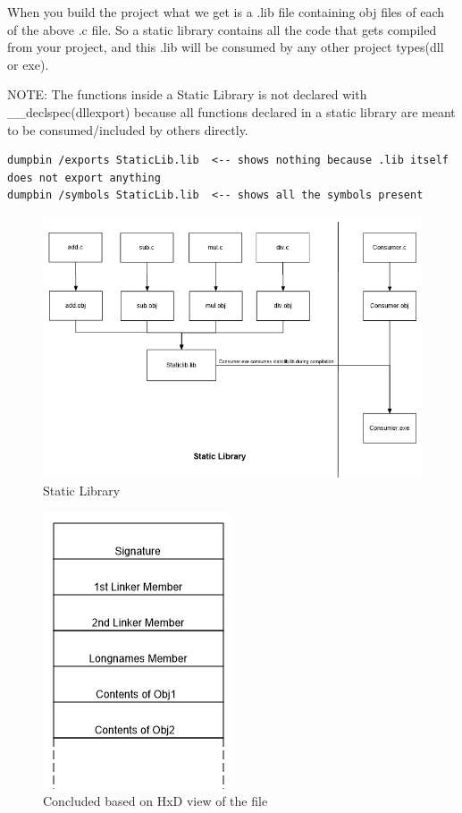 \documentclass{article}
\begin{document}
When you build the project what we get is a .lib file containing obj files
of each of the above .c file. So a static library contains all
the code that gets compiled from your project, and this .lib will
be consumed by any other project types(dll or exe).

NOTE: The functions inside a Static Library is not declared with
\_\_declspec(dllexport) because all functions declared in a static
library are meant to be consumed/included by others directly.

\begin{verbatim}
dumpbin /exports StaticLib.lib  <-- shows nothing because .lib itself does not export anything
dumpbin /symbols StaticLib.lib  <-- shows all the symbols present
\end{verbatim}

\begin{figure}[H]
\centering
\includegraphics[width=\textwidth]{1.StaticLib.png}
\caption{Static Library}
\end{figure}

\begin{figure}[H]
\centering
\includegraphics{2.StructureStaticLib.png}
\caption{Concluded based on HxD view of the file}
\end{figure}
\end{document}
